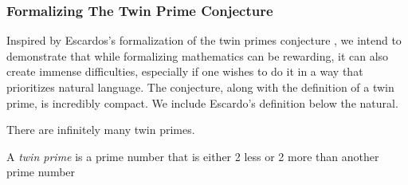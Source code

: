 \begin{code}[hide]
\AgdaSymbol{;}\AgdaSpace{}%
\AgdaSymbol{;}\AgdaSpace{}%
\AgdaSymbol{)}\<%
\\
%
\\[\AgdaEmptyExtraSkip]%
\>[0]\AgdaOperator{\AgdaFunction{\AgdaUnderscore{}-\AgdaUnderscore{}}}\AgdaSpace{}%
\AgdaSymbol{:}\AgdaSpace{}%
\AgdaSpace{}%
\AgdaSpace{}%
\AgdaSpace{}%
\AgdaSpace{}%
\<%
\\
\>[0]%
\>[6]\AgdaOperator{\AgdaFunction{-}}\AgdaSpace{}%
\AgdaSpace{}%
\AgdaSymbol{=}\AgdaSpace{}%
\<%
\\
\>[0]%
\>[6]\AgdaOperator{\AgdaFunction{-}}\AgdaSpace{}%
\AgdaSpace{}%
\AgdaSpace{}%
\AgdaSymbol{=}\AgdaSpace{}%
\<%
\\
\>[0]\AgdaSpace{}%
\AgdaSpace{}%
\AgdaOperator{\AgdaFunction{-}}\AgdaSpace{}%
\AgdaSpace{}%
\AgdaSpace{}%
\AgdaSymbol{=}\AgdaSpace{}%
\AgdaSpace{}%
\AgdaOperator{\AgdaFunction{-}}\AgdaSpace{}%
\<%
\end{code}
\subsubsection{Formalizing The Twin Prime Conjecture}

Inspired by Escardos's formalization of the twin primes conjecture
\cite{escardó2020introduction}, we intend to demonstrate that while formalizing
mathematics can be rewarding, it can also create immense difficulties,
especially if one wishes to do it in a way that prioritizes natural language.
The conjecture, along with the definition of a twin prime, is incredibly
compact. We include Escardo's definition below the natural.

\begin{lem}
There are infinitely many twin primes.
\end{lem}

\begin{definition}\label{def:def10}
A \emph{twin prime} is a prime number that is either 2 less or 2 more than another prime number
\end{definition}

